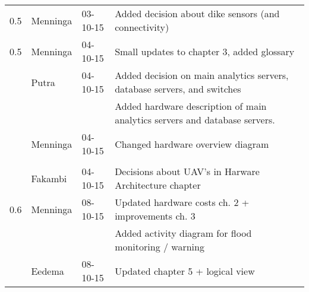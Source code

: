 \begin{longtable}{L{} L{} L{} L{}}
	0.5              & Menninga              & 03-10-15      & Added decision about dike sensors (and connectivity)                                                                                                                                                                       \\
	0.5              & Menninga              & 04-10-15      & Small updates to chapter 3, added glossary                                                                                                                                                                                 \\
	                 & Putra                 & 04-10-15      & Added decision on main analytics servers, database servers, and switches                                                                                                                                                   \\
	                 &                       &               & Added hardware description of main analytics servers and database servers.                                                                                                                                                 \\
	                 & Menninga              & 04-10-15      & Changed hardware overview diagram                                                                                                                                                                                          \\
	       \\        & Fakambi               & 04-10-15      & Decisions about UAV's in Harware Architecture chapter\\
	\midrule
	0.6              & Menninga              & 08-10-15      & Updated hardware costs ch. 2 + improvements ch. 3                                                                                                                                                                          \\
	                 &                       &               & Added activity diagram for flood monitoring / warning                                                                                                                                                                      \\
	                 & Eedema                & 08-10-15      & Updated chapter 5 + logical view                                                                                                                                                                                           \\

\end{longtable}
